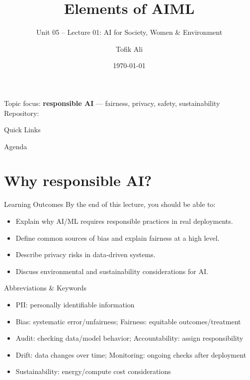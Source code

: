 \documentclass[aspectratio=169]{beamer}
\title[Elements of AIML]{Elements of AIML}
\subtitle{Unit 05 -- Lecture 01: AI for Society, Women \& Environment}
\author{Tofik Ali}
\institute{School of Computer Science, UPES Dehradun}
\date{\today}
\begin{document}
\UPESCoverFrame
\setcounter{framenumber}{0}

\begin{frame}
  \titlepage
  \vspace{0.3em}
  \begin{center}
    \footnotesize Topic focus: \textbf{responsible AI} --- fairness, privacy, safety, sustainability\\[0.25em]
    \footnotesize Repository: \texttt{\AIMLRepoURL}
  \end{center}
  \slidesources{\AIMLUnitVSources}
\end{frame}

\begin{frame}{Quick Links}
  \centering
  \hyperlink{sec:why}{}\hspace{0.6em}
  \hyperlink{sec:bias}{}\hspace{0.6em}
  \hyperlink{sec:privacy}{}\hspace{0.6em}
  \hyperlink{sec:env}{}\hspace{0.6em}
  \hyperlink{sec:summary}{}
\end{frame}

\begin{frame}{Agenda}
  \tableofcontents
\end{frame}

\section{Why responsible AI?}
\label{sec:why}

\begin{frame}{Learning Outcomes}
  By the end of this lecture, you should be able to:
  \begin{itemize}[<+->]
    \item Explain why AI/ML requires responsible practices in real deployments.
    \item Define common sources of bias and explain fairness at a high level.
    \item Describe privacy risks in data-driven systems.
    \item Discuss environmental and sustainability considerations for AI.
  \end{itemize}
\end{frame}

\begin{frame}{Abbreviations \& Keywords}
  \begin{itemize}[<+->]
    \item PII: personally identifiable information
    \item Bias: systematic error/unfairness; Fairness: equitable outcomes/treatment
    \item Audit: checking data/model behavior; Accountability: assign responsibility
    \item Drift: data changes over time; Monitoring: ongoing checks after deployment
    \item Sustainability: energy/compute cost considerations
  \end{itemize}
\end{frame}
\end{document}
